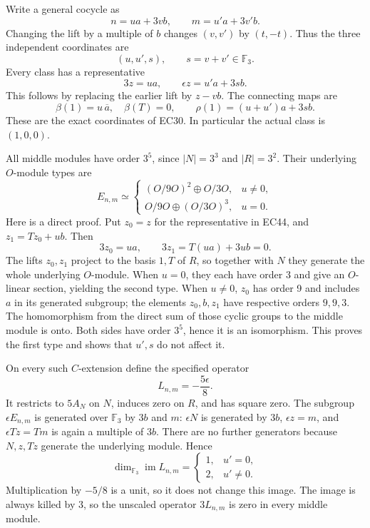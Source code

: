 \documentclass[
  10pt,
  a4paper,
]{article}
\begin{document}
Write a general cocycle as \[
n=u a+3v b,\qquad m=u'a+3v'b.
\] Changing the lift by a multiple of \(b\) changes \((v,v')\) by
\((t,-t)\). Thus the three independent coordinates are \[
(u,u',s),\qquad s=v+v'\in\mathbb F_3.
\tag{EC43}
\] Every class has a representative \[
3z=u a,\qquad
\epsilon z=u'a+3s b.
\tag{EC44}
\] This follows by replacing the earlier lift by \(z-vb\). The
connecting maps are \[
\beta(1)=u\,\overline a,\quad\beta(T)=0,\qquad
\rho(1)=(u+u')a+3s b.
\tag{EC45}
\] These are the exact coordinates of EC30. In particular the actual
class is \((1,0,0)\).

All middle modules have order \(3^5\), since \(|N|=3^3\) and
\(|R|=3^2\). Their underlying \(O\)-module types are \[
E_{n,m}\simeq
\begin{cases}
(O/9O)^2\oplus O/3O,&u\ne0,\\
O/9O\oplus(O/3O)^3,&u=0.
\end{cases}
\tag{EC46}
\] Here is a direct proof. Put \(z_0=z\) for the representative in EC44,
and \(z_1=Tz_0+u b\). Then \[
3z_0=u a,\qquad 3z_1=T(u a)+3u b=0.
\] The lifts \(z_0,z_1\) project to the basis \(1,T\) of \(R\), so
together with \(N\) they generate the whole underlying \(O\)-module.
When \(u=0\), they each have order 3 and give an \(O\)-linear section,
yielding the second type. When \(u\ne0\), \(z_0\) has order 9 and
includes \(a\) in its generated subgroup; the elements \(z_0,b,z_1\)
have respective orders \(9,9,3\). The homomorphism from the direct sum
of those cyclic groups to the middle module is onto. Both sides have
order \(3^5\), hence it is an isomorphism. This proves the first type
and shows that \(u',s\) do not affect it.

On every such \(C\)-extension define the specified operator \[
L_{n,m}=-\frac{5\epsilon}{8}.
\tag{EC47}
\] It restricts to \(5A_N\) on \(N\), induces zero on \(R\), and has
square zero. The subgroup \(\epsilon E_{n,m}\) is generated over
\(\mathbb F_3\) by \(3b\) and \(m\): \(\epsilon N\) is generated by
\(3b\), \(\epsilon z=m\), and \(\epsilon Tz=Tm\) is again a multiple of
\(3b\). There are no further generators because \(N,z,Tz\) generate the
underlying module. Hence \[
\dim_{\mathbb F_3}\operatorname{im}L_{n,m}
=\begin{cases}
1,&u'=0,\\
2,&u'\ne0.
\end{cases}
\tag{EC48}
\] Multiplication by \(-5/8\) is a unit, so it does not change this
image. The image is always killed by 3, so the unscaled operator
\(3L_{n,m}\) is zero in every middle module.
\end{document}
